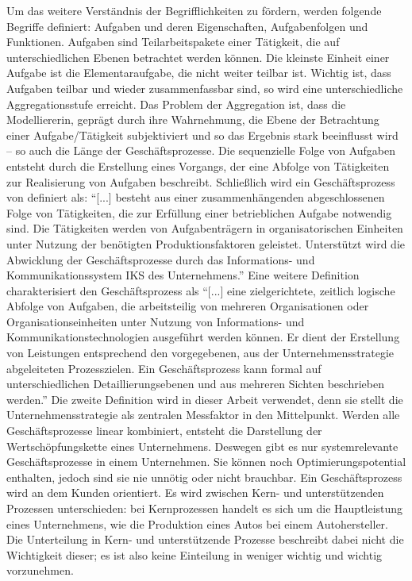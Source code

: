 Um das weitere Verständnis der Begrifflichkeiten zu fördern, werden folgende Begriffe definiert\autocite[vgl.][S.\,4-5]{staud_geschaftsprozessanalyse_2006}: Aufgaben und deren Eigenschaften, Aufgabenfolgen und Funktionen. Aufgaben sind Teilarbeitspakete einer Tätigkeit, die auf unterschiedlichen Ebenen betrachtet werden können. Die kleinste Einheit einer Aufgabe ist die Elementaraufgabe, die nicht weiter teilbar ist. Wichtig ist, dass Aufgaben teilbar und wieder zusammenfassbar sind, so wird eine unterschiedliche Aggregationsstufe erreicht. Das Problem der Aggregation ist, dass die Modelliererin, geprägt durch ihre Wahrnehmung, die Ebene der Betrachtung einer Aufgabe/Tätigkeit subjektiviert und so das Ergebnis stark beeinflusst wird -- so auch die Länge der Geschäftsprozesse. Die sequenzielle Folge von Aufgaben entsteht durch die Erstellung eines Vorgangs, der eine Abfolge von Tätigkeiten zur Realisierung von Aufgaben beschreibt. Schließlich wird ein Geschäftsprozess von \cite{staud_geschaftsprozessanalyse_2006} definiert als: \enquote{[...] besteht aus einer zusammenhängenden abgeschlossenen Folge von Tätigkeiten, die zur Erfüllung einer betrieblichen Aufgabe notwendig sind. Die Tätigkeiten werden von Aufgabenträgern in organisatorischen Einheiten unter Nutzung der benötigten Produktionsfaktoren geleistet. Unterstützt wird die Abwicklung der Geschäftsprozesse durch das Informations- und Kommunikationssystem IKS des Unternehmens.}\autocite[][S.\,9]{staud_geschaftsprozessanalyse_2006} Eine weitere Definition charakterisiert den Geschäftsprozess als \enquote{[...] eine zielgerichtete, zeitlich logische Abfolge von Aufgaben, die arbeitsteilig von mehreren Organisationen oder Organisationseinheiten unter Nutzung von Informations- und Kommunikationstechnologien ausgeführt werden können. Er dient der Erstellung von Leistungen entsprechend den vorgegebenen, aus der Unternehmensstrategie abgeleiteten Prozesszielen. Ein Geschäftsprozess kann formal auf unterschiedlichen Detaillierungsebenen und aus mehreren Sichten beschrieben werden.}\autocite[][S.\,41]{gadatsch_grundkurs_2010} Die zweite Definition wird in dieser Arbeit verwendet, denn sie stellt die Unternehmensstrategie als zentralen Messfaktor in den Mittelpunkt. Werden alle Geschäftsprozesse linear kombiniert, entsteht die Darstellung der Wertschöpfungskette eines Unternehmens. Deswegen gibt es nur systemrelevante Geschäftsprozesse in einem Unternehmen. Sie können noch Optimierungspotential enthalten, jedoch sind sie nie unnötig oder nicht brauchbar. Ein Geschäftsprozess wird an dem Kunden orientiert. Es wird zwischen Kern- und unterstützenden Prozessen unterschieden: bei Kernprozessen handelt es sich um die Hauptleistung eines Unternehmens, wie die Produktion eines Autos bei einem Autohersteller. Die Unterteilung in Kern- und unterstützende Prozesse beschreibt dabei nicht die Wichtigkeit dieser; es ist also keine Einteilung in weniger wichtig und wichtig vorzunehmen.\autocite[vgl.][S.\,11]{staud_geschaftsprozessanalyse_2006} \par

